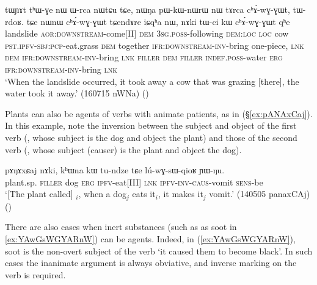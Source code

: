 \begin{exe}
\ex \label{ex:nWNa.chowGWt} 
\gll tɯɲɤt tʰɯ-ɣe nɯ ɯ-rca nɯtɕu tɕe, nɯŋa pɯ-kɯ-nɯrɯ nɯ tɤrca cʰɤ́-wɣ-ɣɯt, tɯ-rdoʁ. tɕe nɯnɯ cʰɤ́-wɣ-ɣɯt tɕendɤre iɕqʰa nɯ, nɤki tɯ-ci kɯ cʰɤ́-wɣ-ɣɯt qʰe \\
landslide \textsc{aor}:\textsc{downstream}-come[II] \textsc{dem} \textsc{3sg}.\textsc{poss}-following \textsc{dem}:\textsc{loc} \textsc{loc} cow  \textsc{pst}.\textsc{ipfv}-\textsc{sbj}:\textsc{pcp}-eat.grass \textsc{dem} together \textsc{ifr}:\textsc{downstream}-\textsc{inv}-bring one-piece, \textsc{lnk} \textsc{dem} \textsc{ifr}:\textsc{downstream}-\textsc{inv}-bring \textsc{lnk} \textsc{filler} \textsc{dem} \textsc{filler} \textsc{indef}.\textsc{poss}-water \textsc{erg} \textsc{ifr}:\textsc{downstream}-\textsc{inv}-bring  \textsc{lnk} \\
\glt `When the landslide occurred, it took away a cow that was grazing [there], the water took it away.' (160715 nWNa) 	
()
\end{exe}

Plants can also be agents of verbs with animate patients, as in (§\ref{ex:pANAxCaj}). In this example, note the inversion between the subject and object of the first verb (, whose subject is the dog and object the plant) and those of the second verb (, whose subject (causer) is the plant and object the dog).

\begin{exe}
\ex \label{ex:pANAxCaj} 
\gll pɤŋɤxɕaj nɤki, kʰɯna kɯ tu-ndze tɕe lú-wɣ-sɯ-qioʁ ɲɯ-ŋu. \\
plant.sp. \textsc{filler} dog \textsc{erg} \textsc{ipfv}-eat[III] \textsc{lnk} \textsc{ipfv}-\textsc{inv}-\textsc{caus}-vomit \textsc{sens}-be \\
\glt `[The plant called] $_i$, when a dog$_j$ eats it$_i$, it makes it$_j$ vomit.' (140505 panaxCAj)
()
\end{exe}

There are also cases when inert substances (such as as soot in \ref{ex:YAwGsWGYARnW}) can be agents. Indeed, in (\ref{ex:YAwGsWGYARnW}), soot is the non-overt subject of the verb   `it caused them to become black'. In such cases the inanimate argument is always obviative, and inverse marking on the verb is required.

